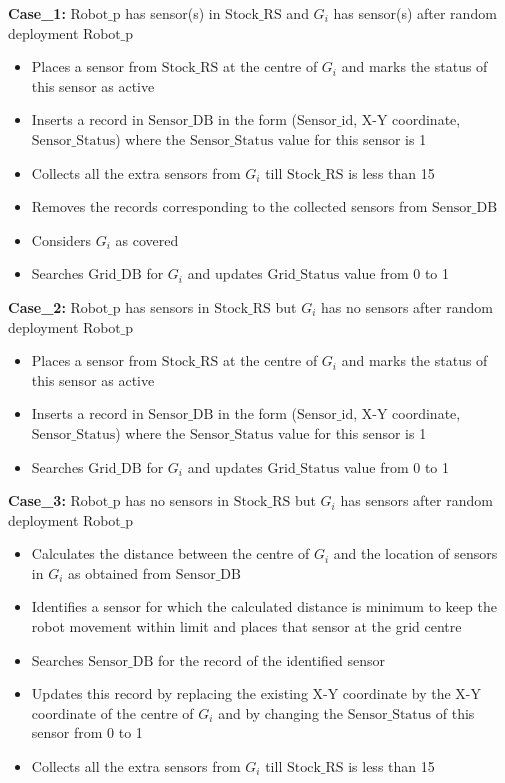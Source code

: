 \documentclass{article}
\begin{document}
\noindent\textbf{Case\_1:} $\text{Robot\_p}$ has sensor(s) in $\text{Stock\_RS}$ and $G_i$ has sensor(s) after random deployment $\text{Robot\_p}$
\begin{itemize}
    \item Places a sensor from $\text{Stock\_RS}$ at the centre of $G_i$ and marks the status of this sensor as active
    \item Inserts a record in $\text{Sensor\_DB}$ in the form ($\text{Sensor\_id}$, X-Y coordinate, $\text{Sensor\_Status}$) where the $\text{Sensor\_Status}$ value for this sensor is 1
    \item Collects all the extra sensors from $G_i$ till $\text{Stock\_RS}$ is less than 15
    \item Removes the records corresponding to the collected sensors from $\text{Sensor\_DB}$
    \item Considers $G_i$ as covered
    \item Searches $\text{Grid\_DB}$ for $G_i$ and updates $\text{Grid\_Status}$ value from 0 to 1
\end{itemize}

\noindent\textbf{Case\_2:} $\text{Robot\_p}$ has sensors in $\text{Stock\_RS}$ but $G_i$ has no sensors after random deployment $\text{Robot\_p}$
\begin{itemize}
    \item Places a sensor from $\text{Stock\_RS}$ at the centre of $G_i$ and marks the status of this sensor as active
    \item Inserts a record in $\text{Sensor\_DB}$ in the form ($\text{Sensor\_id}$, X-Y coordinate, $\text{Sensor\_Status}$) where the $\text{Sensor\_Status}$ value for this sensor is 1
    \item Searches $\text{Grid\_DB}$ for $G_i$ and updates $\text{Grid\_Status}$ value from 0 to 1
\end{itemize}

\noindent\textbf{Case\_3:} $\text{Robot\_p}$ has no sensors in $\text{Stock\_RS}$ but $G_i$ has sensors after random deployment $\text{Robot\_p}$
\begin{itemize}
    \item Calculates the distance between the centre of $G_i$ and the location of sensors in $G_i$ as obtained from $\text{Sensor\_DB}$
    \item Identifies a sensor for which the calculated distance is minimum to keep the robot movement within limit and places that sensor at the grid centre
    \item Searches $\text{Sensor\_DB}$ for the record of the identified sensor
    \item Updates this record by replacing the existing X-Y coordinate by the X-Y coordinate of the centre of $G_i$ and by changing the $\text{Sensor\_Status}$ of this sensor from 0 to 1
    \item Collects all the extra sensors from $G_i$ till $\text{Stock\_RS}$ is less than 15
\end{itemize}
\end{document}
